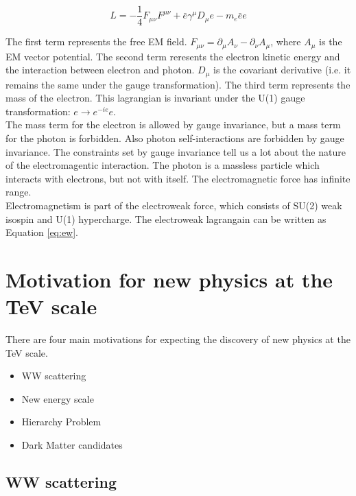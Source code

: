 \begin{equation}
L = -\frac{1}{4}F_{\mu\nu}F^{\mu\nu} + \bar{e}\gamma^{\mu}D_{\mu}e -
m_{e}\bar{e}e
\label{eq:qed}
\end{equation} 

The first term represents the free EM field. $F_{\mu\nu} = \partial_{\mu}A_{\nu}
- \partial_{\nu}A_{\mu}$, where $A_{\mu}$ is the EM vector potential. The second
 term reresents the electron kinetic energy and the interaction between electron
and photon. $D_{\mu}$ is the covariant derivative (i.e. it remains the same
under the gauge transformation). The third term represents the mass of the
electron. This lagrangian is invariant under the U(1) gauge transformation: $e
\rightarrow e^{-ie}e$. \\

The mass term for the electron is allowed by gauge invariance, but a mass term for 
the photon is forbidden. Also photon self-interactions are forbidden by gauge 
invariance. The constraints set by gauge invariance tell us a lot about the
nature of the electromagentic interaction. The photon is a massless particle which 
interacts with electrons, but not with itself. The electromagnetic force has 
infinite range. \\

Electromagnetism is part of the electroweak force, which consists of SU(2) weak
isospin and U(1) hypercharge. The electroweak lagrangain can be written as
Equation \ref{eq:ew}. \\

\begin{equation}
\label{eq:ew}
\end{equation}  

\section{Motivation for new physics at the TeV scale}

There are four main motivations for expecting the discovery of new physics at 
the TeV scale.

\begin{itemize}
\item WW scattering
\item New energy scale
\item Hierarchy Problem
\item Dark Matter candidates
\end{itemize}

\subsection{WW scattering}

